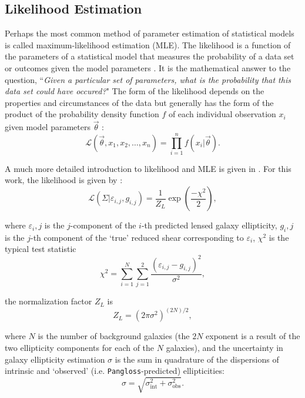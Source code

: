 \documentclass[%
 reprint,
 amsmath,amssymb,
 aps,nofootinbib
]{revtex4-1}
\begin{document}
\subsection{Likelihood Estimation} \label{mle}

Perhaps the most common method of parameter estimation of statistical models is called maximum-likelihood estimation (MLE). The likelihood is a function of the parameters of a statistical model that measures the probability of a data set or outcomes given the model parameters \cite{??}. It is the mathematical answer to the question, ``\textit{Given a particular set of parameters, what is the probability that this data set could have occured?}" The form of the likelihood depends on the properties and circumstances of the data but generally has the form of the product of the probability density function $f$ of each individual observation $x_i$ given model parameters $\vec{\theta}$ \cite{likelihood}:
\begin{equation}
\mathcal{L}(\vec{\theta},x_1,x_2,\ldots,x_n)=\prod_{i=1}^nf(x_i|\vec{\theta}).
\end{equation}

A much more detailed introduction to likelihood and MLE is given in \cite{likelihood}. For this work, the likelihood is given by \cite{marshall_thesis}:
\begin{equation}\label{likelihood}
\mathcal{L}(\Sigma|\varepsilon_{i,j},g_{i,j})=\frac{1}{Z_L}\exp\left(\frac{-\chi^2}{2}\right),
\end{equation}

\noindent where $\varepsilon_i,j$ is the $j$-component of the $i$-th predicted lensed galaxy ellipticity, $g_i,j$ is the $j$-th component of the `true' reduced shear corresponding to $\varepsilon_i$, $\chi^2$ is the typical test statistic
\begin{equation}\label{chi2}
\chi^2=\sum_{i=1}^N\sum_{j=1}^2\frac{(\varepsilon_{i,j}-g_{i,j})^2}{\sigma^2},
\end{equation}

\noindent the normalization factor $Z_L$ is
\begin{equation}
Z_L=(2\pi\sigma^2)^{(2N)/2},
\end{equation}

\noindent where $N$ is the number of background galaxies (the $2N$ exponent is a result of the two ellipticity components for each of the $N$ galaxies), and the uncertainty in galaxy ellipticity estimation $\sigma$ is the sum in quadrature of the dispersions of intrinsic and `observed' (i.e. \texttt{Pangloss}-predicted) ellipticities:
\begin{equation}\label{sigma}
\sigma=\sqrt{\sigma_{\text{int}}^2+\sigma_{\text{obs}}^2}.
\end{equation}
\end{document}
